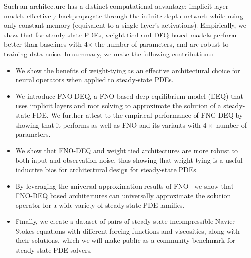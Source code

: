 Such an architecture has a distinct computational advantage: %
implicit layer models effectively
backpropagate through the infinite-depth network while using only constant memory (equivalent to a single layer’s activations).
Empirically, we show that for steady-state PDEs, 
weight-tied and DEQ based models perform better than baselines with 4$\times$ 
the number of parameters, and are robust to training data noise. 
In summary, we make the following contributions:
\begin{itemize}%
    \item We show the benefits of weight-tying as an effective architectural choice for neural operators when applied to steady-state PDEs.
    \item We introduce FNO-DEQ, a FNO based deep equilibrium model (DEQ) that uses implicit layers and 
        root solving to approximate the solution of a steady-state PDE. We further attest to the empirical performance 
        of FNO-DEQ by showing that it performs as well as FNO and its variants with $4\times$ number of parameters.
    \item  We show that FNO-DEQ and weight tied architectures 
    are more robust to both input and observation noise, 
    thus showing that weight-tying is a useful inductive bias for 
    architectural design for steady-state PDEs.
    \item By leveraging the universal approximation results of FNO~\citep{kovachki2021universal} we show that 
        FNO-DEQ based architectures can universally approximate the solution operator for a wide variety of steady-state PDE families. 
    \item Finally, we create a dataset of pairs of steady-state incompressible Navier-Stokes equations with different forcing functions and viscosities, along with their solutions, which we will make public as a community benchmark for steady-state PDE solvers. 
\end{itemize}




    




